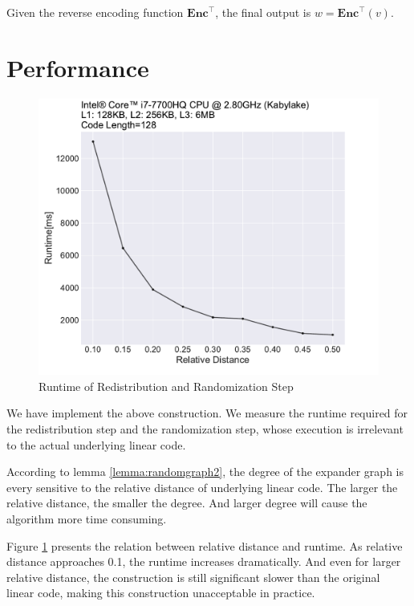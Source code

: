 Given the reverse encoding function $\textbf{Enc}^{\top}$, the final output is $w = \textbf{Enc}^{\top}(v)$.

\section{Performance}

\begin{figure}[h]
    \centering
    \includegraphics[width=1\textwidth]{graph/degree.pdf}
    \caption{Runtime of Redistribution and Randomization Step}
    \label{fig:degree}
\end{figure}


We have implement the above construction. We measure the runtime required for the redistribution step and the randomization step, whose execution is irrelevant to the actual underlying linear code.


According to lemma \ref{lemma:randomgraph2}, the degree of the expander graph is every sensitive to the relative distance of underlying linear code. The larger the relative distance, the smaller the degree. And larger degree will cause the algorithm more time consuming.

Figure \ref{fig:degree} presents the relation between relative distance and runtime. As relative distance approaches 0.1, the runtime increases dramatically. And even for larger relative distance, the construction is still significant slower than the original linear code, making this construction unacceptable in practice.

